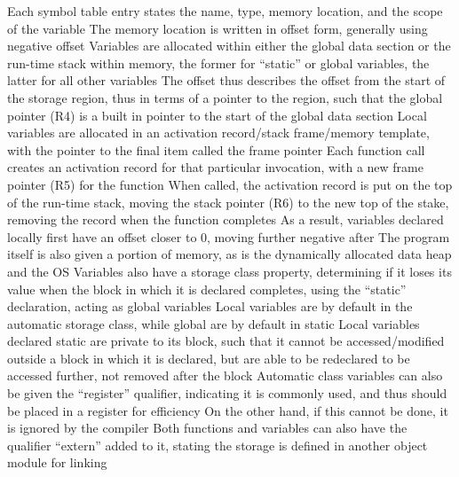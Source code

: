 \documentclass[11 pt, twoside]{article}
\newenvironment{outline*}
{
	\begin{outline}[enumerate]
	}
	{\end{outline}
}
\begin{document}
\begin{outline*}
\2 Each symbol table entry states the name, type, memory location, and the scope of the variable
\3 The memory location is written in offset form, generally using negative offset
\2 Variables are allocated within either the global data section or the run-time stack within memory, the former for ``static'' or global variables, the latter for all other variables
\3 The offset thus describes the offset from the start of the storage region, thus in terms of a pointer to the region, such that the global pointer (R4) is a built in pointer to the start of the global data section
\3 Local variables are allocated in an activation record/stack frame/memory template, with the pointer to the final item called the frame pointer
\4 Each function call creates an activation record for that particular invocation, with a new frame pointer (R5) for the function
\4 When called, the activation record is put on the top of the run-time stack, moving the stack pointer (R6) to the new top of the stake, removing the record when the function completes
\4 As a result, variables declared locally first have an offset closer to 0, moving further negative after
\3 The program itself is also given a portion of memory, as is the dynamically allocated data heap and the OS
\1 Variables also have a storage class property, determining if it loses its value when the block in which it is declared completes, using the ``static'' declaration, acting as global variables
\2 Local variables are by default in the automatic storage class, while global are by default in static
\2 Local variables declared static are private to its block, such that it cannot be accessed/modified outside a block in which it is declared, but are able to be redeclared to be accessed further, not removed after the block
\2 Automatic class variables can also be given the ``register'' qualifier, indicating it is commonly used, and thus should be placed in a register for efficiency
\3 On the other hand, if this cannot be done, it is ignored by the compiler
\2 Both functions and variables can also have the qualifier ``extern'' added to it, stating the storage is defined in another object module for linking
\end{outline*}
\end{document}
